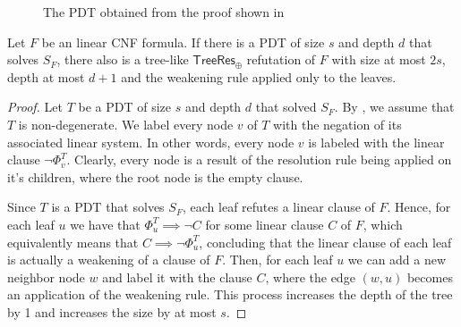 \begin{figure}[H]
    \centering


    \caption{The PDT obtained from the proof shown in }
    \label{pdt_cnf}
\end{figure}

\begin{lemma}
    Let $F$ be an linear CNF formula. If there is a PDT of size $s$ and depth $d$ that solves $S_F$, there also is a tree-like $\mathsf{TreeRes}_\oplus$ refutation of $F$ with size at most $2s$, depth at most $d+1$ and the weakening rule applied only to the leaves.
\end{lemma}

\begin{proof}
    Let $T$ be a PDT of size $s$ and depth $d$ that solved $S_F$. By , we assume that $T$ is non-degenerate. We label every node $v$ of $T$ with the negation of its associated linear system. In other words, every node $v$ is labeled with the linear clause $\lnot \Phi_v^T$. Clearly, every node is a result of the resolution rule being applied on it's children, where the root node is the empty clause.

    Since $T$ is a PDT that solves $S_F$, each leaf refutes a linear clause of $F$. Hence, for each leaf $u$ we have that $\Phi_{u}^T \implies \lnot C$ for some linear clause $C$ of $F$, which equivalently means that $C \implies \lnot \Phi_u^T$, concluding that the linear clause of each leaf is actually a weakening of a clause of $F$. Then, for each leaf $u$ we can add a new neighbor node $w$ and label it with the clause $C$, where the edge $(w,u)$ becomes an application of the weakening rule. This process increases the depth of the tree by 1 and increases the size by at most $s$.
\end{proof}

